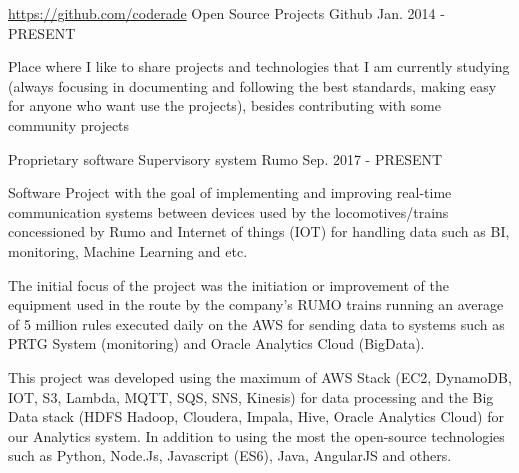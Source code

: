 

\begin{cventries}
  \cventry
    {\hyperref[https://github.com/coderade]{https://github.com/coderade}} %
    {Open Source Projects}%
    {Github} %
    {Jan. 2014 - PRESENT} %
    {
      \begin{cvitems} %
       \item{Place where I like to share projects and technologies that I am currently studying (always focusing in documenting and following the best standards, making easy for anyone who want use the projects), besides contributing with some community projects }
      \end{cvitems}
    }
  \cventry
    {Proprietary software} %
    {Supervisory system}%
    {Rumo} %
    {Sep. 2017 - PRESENT} %
    {
      \begin{cvitems} %
       \item{Software Project with the goal of implementing and improving real-time communication systems between devices used by the locomotives/trains concessioned by Rumo and Internet of things (IOT) for handling data such as BI, monitoring, Machine Learning and etc.}
       \item{The initial focus of the project was the initiation or improvement of the equipment used in the route by the company's RUMO trains running an average of 5 million rules executed daily on the AWS for sending data to systems such as PRTG System (monitoring) and Oracle Analytics Cloud (BigData).}
       \item{This project was developed using the maximum of AWS Stack (EC2, DynamoDB, IOT, S3, Lambda, MQTT, SQS, SNS, Kinesis) for data processing and the Big Data stack (HDFS Hadoop, Cloudera, Impala, Hive, Oracle Analytics Cloud) for our Analytics system. In addition to using the most the open-source technologies such as Python, Node.Js, Javascript (ES6), Java, AngularJS and others.}
      \end{cvitems}
    }

\end{cventries}
